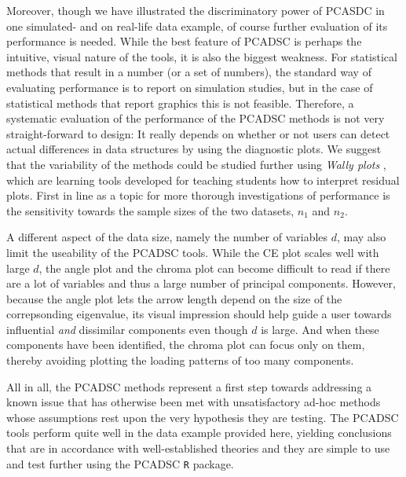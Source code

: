\documentclass[]{interact}
\theoremstyle{plain}%
\theoremstyle{definition}
\theoremstyle{remark}
\begin{document}
Moreover, though we have illustrated the discriminatory power of PCASDC in one simulated- and on real-life data example, of course further evaluation of its performance is needed.
While the best feature of PCADSC is perhaps the intuitive, visual nature of the tools, it is also the biggest weakness. For statistical methods that result in a number (or a set of numbers), the standard way of evaluating performance is to report on simulation studies, but in the case of statistical methods that report graphics this is not feasible. Therefore, a systematic evaluation of the performance of the PCADSC methods is not very straight-forward to design: It really depends on whether or not users can detect actual differences in data structures by using the diagnostic plots. We suggest that the variability of the methods could be studied further using \textit{Wally plots} \cite{Ekstrom2014}, which are learning tools developed for teaching students how to interpret residual plots. First in line as a topic for more thorough investigations of performance is the sensitivity towards the sample sizes of the two datasets, $n_1$ and $n_2$.

A different aspect of the data size, namely the number of variables $d$, may also limit the useability of the PCADSC tools. While the CE plot scales well with large $d$, the angle plot and the chroma plot can become difficult to read if there are a lot of variables and thus a large number of principal components. However, because the angle plot lets the arrow length depend on the size of the correpsonding eigenvalue, its visual impression should help guide a user towards influential \textit{and} dissimilar components even though $d$ is large. And when these components have been identified, the chroma plot can focus only on them, thereby avoiding plotting the loading patterns of too many components.  

All in all, the PCADSC methods represent a first step towards addressing a known issue that has otherwise been met with unsatisfactory ad-hoc methods whose assumptions rest upon the very hypothesis they are testing. The PCADSC tools perform quite well in the data example provided here, yielding conclusions that are in accordance with well-established theories and they are simple to use and test further using the PCADSC \texttt{R} package. 

\end{document}
